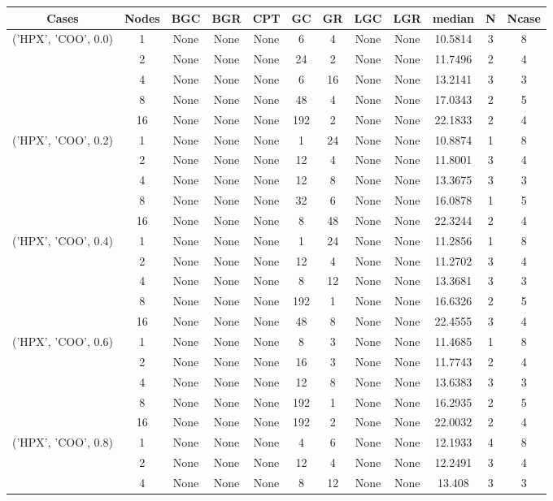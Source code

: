 \begin{tabular}{cccccccccccc}
\hline
Cases & Nodes& BGC& BGR& CPT& GC& GR& LGC& LGR& median & N & Ncase \\
\hline
\multirow{5}{*}{('HPX', 'COO', 0.0)}& 1& None& None& None& 6& 4& None& None& 10.5814& 3& 8\\
& 2& None& None& None& 24& 2& None& None& 11.7496& 2& 4\\
& 4& None& None& None& 6& 16& None& None& 13.2141& 3& 3\\
& 8& None& None& None& 48& 4& None& None& 17.0343& 2& 5\\
& 16& None& None& None& 192& 2& None& None& 22.1833& 2& 4\\
\hline
\multirow{5}{*}{('HPX', 'COO', 0.2)}& 1& None& None& None& 1& 24& None& None& 10.8874& 1& 8\\
& 2& None& None& None& 12& 4& None& None& 11.8001& 3& 4\\
& 4& None& None& None& 12& 8& None& None& 13.3675& 3& 3\\
& 8& None& None& None& 32& 6& None& None& 16.0878& 1& 5\\
& 16& None& None& None& 8& 48& None& None& 22.3244& 2& 4\\
\hline
\multirow{5}{*}{('HPX', 'COO', 0.4)}& 1& None& None& None& 1& 24& None& None& 11.2856& 1& 8\\
& 2& None& None& None& 12& 4& None& None& 11.2702& 3& 4\\
& 4& None& None& None& 8& 12& None& None& 13.3681& 3& 3\\
& 8& None& None& None& 192& 1& None& None& 16.6326& 2& 5\\
& 16& None& None& None& 48& 8& None& None& 22.4555& 3& 4\\
\hline
\multirow{5}{*}{('HPX', 'COO', 0.6)}& 1& None& None& None& 8& 3& None& None& 11.4685& 1& 8\\
& 2& None& None& None& 16& 3& None& None& 11.7743& 2& 4\\
& 4& None& None& None& 12& 8& None& None& 13.6383& 3& 3\\
& 8& None& None& None& 192& 1& None& None& 16.2935& 2& 5\\
& 16& None& None& None& 192& 2& None& None& 22.0032& 2& 4\\
\hline
\multirow{5}{*}{('HPX', 'COO', 0.8)}& 1& None& None& None& 4& 6& None& None& 12.1933& 4& 8\\
& 2& None& None& None& 12& 4& None& None& 12.2491& 3& 4\\
& 4& None& None& None& 8& 12& None& None& 13.408& 3& 3\\

\end{tabular}
